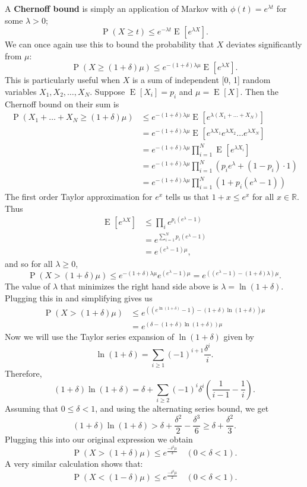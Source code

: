 \documentclass[14pt]{extreport}
\newcommand{\E}[2][]{\operatorname{E}_{#1}\left[#2\right]}
\renewcommand{\Pr}[1]{\operatorname{P}\left(#1\right)}
\begin{document}
\vspace{3mm}
A \textbf{Chernoff bound} is simply an application of Markov with $\phi(t) = e^{\lambda t}$ for some $\lambda > 0$; $$\Pr{X \ge t} \le e^{-\lambda t} \E{e^{\lambda X}}.$$ We can once again use this to bound the probability that $X$ deviates significantly from $\mu$: $$\Pr{X \ge (1 + \delta)\mu} \le e^{-(1 + \delta)\lambda\mu} \E{e^{\lambda X}}.$$ This is particularly useful when $X$ is a sum of independent [0, 1] random variables $X_{1}, X_{2}, \dots, X_{N}$. Suppose $\E{X_{i}} = p_{i}$ and $\mu = \E{X}$. Then the Chernoff bound on their sum is 
    $$\begin{aligned}
        \Pr{X_{1} + \dots + X_{N} \ge (1 + \delta)\mu} &\le e^{-(1 + \delta)\lambda\mu}\E{e^{\lambda(X_{1} + \dots + X_{N})}} \\
        &= e^{-(1 + \delta)\lambda\mu}\E{e^{\lambda X_{1}}e^{\lambda X_{2}}\dots e^{\lambda X_{N}}} \\
        &= e^{-(1 + \delta)\lambda\mu}\prod_{i = 1}^{N}\E{e^{\lambda X_{i}}} \\
        &= e^{-(1 + \delta)\lambda\mu}\prod_{i = 1}^{N} (p_{i}e^{\lambda} + (1 - p_{i}) \cdot 1) \\
        &= e^{-(1 + \delta)\lambda\mu}\prod_{i = 1}^{N} (1 + p_{i}(e^{\lambda} - 1))
    \end{aligned}$$
    The first order Taylor approximation for $e^{x}$ tells us that $1 + x \le e^{x}$ for all $x \in \mathbb{R}$. Thus
    $$\begin{aligned}
        \E{e^{\lambda X}} &\le \prod_{i} e^{p_{i}(e^{\lambda} - 1)} \\
        &= e^{\sum_{i = 1}^{N} p_{i}(e^{\lambda} - 1)} \\
        &= e^{(e^{\lambda} - 1)\mu},
    \end{aligned}$$
    and so for all $\lambda \ge 0$, $$\Pr{X > (1 + \delta) \mu} \le e^{-(1 + \delta)\lambda\mu}e^{(e^{\lambda} - 1)\mu} = e^{((e^{\lambda} - 1)-(1 + \delta)\lambda)\mu}.$$
    The value of $\lambda$ that minimizes the right hand side above is $\lambda = \ln(1 + \delta)$. Plugging this in and simplifying gives us
    $$\begin{aligned}
        \Pr{X > (1 + \delta) \mu} &\le e^{((e^{\ln(1 + \delta)} - 1)-(1 + \delta)\ln(1 + \delta))\mu} \\
        &= e^{(\delta - (1 + \delta)\ln(1 + \delta))\mu}
    \end{aligned}$$
    Now we will use the Taylor series expansion of $\ln(1 + \delta)$ given by $$\ln(1 + \delta) = \sum_{i \ge 1}(-1)^{i + 1}\frac{\delta^{i}}{i}.$$ Therefore, $$(1 + \delta)\ln(1 + \delta) = \delta + \sum_{i \ge 2} (-1)^{i}\delta^{i}\left(\frac{1}{i - 1} - \frac{1}{i}\right).$$ Assuming that $0 \le \delta < 1$, and using the alternating series bound, we get $$(1 + \delta)\ln(1 + \delta) > \delta + \frac{\delta^{2}}{2} - \frac{\delta^{3}}{6} \ge \delta + \frac{\delta^{2}}{3}.$$ Plugging this into our original expression we obtain $$\Pr{X > (1 + \delta) \mu} \le e^{\frac{-\delta^{2}\mu}{3}}\quad (0 < \delta < 1).$$ A very similar calculation shows that: $$\Pr{X < (1 - \delta)\mu} \le e^{\frac{-\delta^{2}\mu}{2}}\quad (0 < \delta < 1).$$
\end{document}
